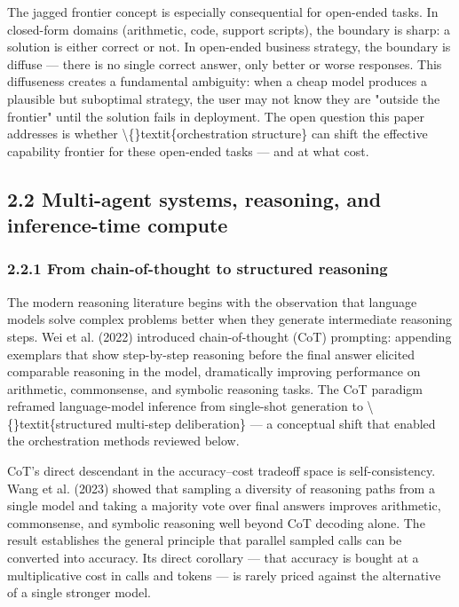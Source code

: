 \documentclass[11pt,a4paper]{article}
\begin{document}
The jagged frontier concept is especially consequential for open-ended tasks.
In closed-form domains (arithmetic, code, support scripts), the boundary is
sharp: a solution is either correct or not. In open-ended business strategy,
the boundary is diffuse — there is no single correct answer, only better or
worse responses. This diffuseness creates a fundamental ambiguity: when a
cheap model produces a plausible but suboptimal strategy, the user may not
know they are "outside the frontier" until the solution fails in deployment.
The open question this paper addresses is whether \textbackslash\{\}textit\{orchestration structure\}
can shift the effective capability frontier for these open-ended tasks —
and at what cost.

\subsection{2.2 Multi-agent systems, reasoning, and inference-time compute}

\subsubsection{2.2.1 From chain-of-thought to structured reasoning}

The modern reasoning literature begins with the observation that language
models solve complex problems better when they generate intermediate
reasoning steps. Wei et al. (2022) introduced chain-of-thought (CoT)
prompting: appending exemplars that show step-by-step reasoning before the
final answer elicited comparable reasoning in the model, dramatically
improving performance on arithmetic, commonsense, and symbolic reasoning
tasks. The CoT paradigm reframed language-model inference from
single-shot generation to \textbackslash\{\}textit\{structured multi-step deliberation\} — a
conceptual shift that enabled the orchestration methods reviewed below.

CoT's direct descendant in the accuracy–cost tradeoff space is
self-consistency. Wang et al. (2023) showed that sampling a diversity of
reasoning paths from a single model and taking a majority vote over final
answers improves arithmetic, commonsense, and symbolic reasoning well beyond
CoT decoding alone. The result establishes the general principle that
parallel sampled calls can be converted into accuracy. Its direct corollary
— that accuracy is bought at a multiplicative cost in calls and tokens —
is rarely priced against the alternative of a single stronger model.
\end{document}
